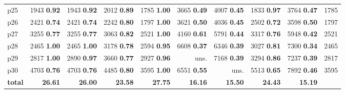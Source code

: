 \begin{tabular}{|l|rrrrrrrr|r|}
p25 & {\footnotesize 1943} \textbf{0.92} & {\footnotesize 1943} \textbf{0.92} & {\footnotesize 2012} \textbf{0.89} & {\footnotesize 1785} \textbf{1.00} & {\footnotesize 3665} \textbf{0.49} & {\footnotesize 4007} \textbf{0.45} & {\footnotesize 1833} \textbf{0.97} & {\footnotesize 3764} \textbf{0.47} & 1785\\
p26 & {\footnotesize 2421} \textbf{0.74} & {\footnotesize 2421} \textbf{0.74} & {\footnotesize 2242} \textbf{0.80} & {\footnotesize 1797} \textbf{1.00} & {\footnotesize 3621} \textbf{0.50} & {\footnotesize 4036} \textbf{0.45} & {\footnotesize 2502} \textbf{0.72} & {\footnotesize 3598} \textbf{0.50} & 1797\\
p27 & {\footnotesize 3255} \textbf{0.77} & {\footnotesize 3255} \textbf{0.77} & {\footnotesize 3063} \textbf{0.82} & {\footnotesize 2521} \textbf{1.00} & {\footnotesize 4160} \textbf{0.61} & {\footnotesize 5791} \textbf{0.44} & {\footnotesize 3317} \textbf{0.76} & {\footnotesize 5948} \textbf{0.42} & 2521\\
p28 & {\footnotesize 2465} \textbf{1.00} & {\footnotesize 2465} \textbf{1.00} & {\footnotesize 3178} \textbf{0.78} & {\footnotesize 2594} \textbf{0.95} & {\footnotesize 6608} \textbf{0.37} & {\footnotesize 6346} \textbf{0.39} & {\footnotesize 3027} \textbf{0.81} & {\footnotesize 7300} \textbf{0.34} & 2465\\
p29 & {\footnotesize 2817} \textbf{1.00} & {\footnotesize 2890} \textbf{0.97} & {\footnotesize 3660} \textbf{0.77} & {\footnotesize 2927} \textbf{0.96} & uns. & {\footnotesize 7168} \textbf{0.39} & {\footnotesize 3294} \textbf{0.86} & {\footnotesize 7237} \textbf{0.39} & 2817\\
p30 & {\footnotesize 4703} \textbf{0.76} & {\footnotesize 4703} \textbf{0.76} & {\footnotesize 4485} \textbf{0.80} & {\footnotesize 3595} \textbf{1.00} & {\footnotesize 6551} \textbf{0.55} & uns. & {\footnotesize 5513} \textbf{0.65} & {\footnotesize 7892} \textbf{0.46} & 3595\\
\hline
\textbf{total} & \textbf{26.61} & \textbf{26.00} & \textbf{23.58} & \textbf{27.75} & \textbf{16.16} & \textbf{15.50} & \textbf{24.43} & \textbf{15.19} & \\
\hline
\end{tabular}

